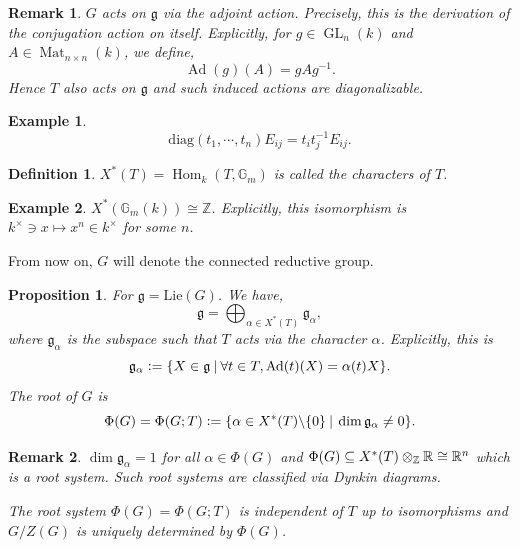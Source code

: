 \documentclass[10pt]{article}
\newtheorem{proposition}{Proposition}[section]
\newtheorem{definition}{Definition}[section]
\newtheorem{remark}{Remark}[section]
\newtheorem{example}{Example}[section]
\numberwithin{equation}{theorem}
\DeclareMathOperator{\GL}{GL}
\DeclareMathOperator{\Ad}{Ad}
\DeclareMathOperator{\Hom}{Hom}
\DeclareMathOperator{\Mat}{Mat}
\newcommand{\defeq}{\vcentcolon=}
\newcommand{\bR}[0]{\mathbb{R}}
\newcommand{\Z}[0]{\mathbb{Z}}
\newcommand{\bG}[0]{\mathbb{G}}
\newcommand{\g}[0]{\mathfrak{g}}
\newcommand{\sep}[0]{\:|\:}
\newcommand{\tens}[1]{%
  \mathbin{\mathop{\otimes}\displaylimits_{#1}}%
}
\begin{document}
\begin{remark}
    $G$ acts on $\g$ via the adjoint action. Precisely, this is the derivation of the conjugation action on itself. Explicitly, for $g\in\GL_n(k)$ and $A\in\Mat_{n\times n}(k)$, we define,
    \begin{equation*}
        \Ad(g)(A) = gAg^{-1}.
    \end{equation*}
    Hence $T$ also acts on $\g$ and such induced actions are diagonalizable.
\end{remark}

\begin{example}
    \begin{equation*}
        \mathrm{diag}(t_1,\cdots,t_n)E_{ij} = t_it_j^{-1}E_{ij}.
    \end{equation*}
\end{example}

\begin{definition}
    $X^*(T)=\Hom_k(T,\bG_m)$ is called the characters of $T$.
\end{definition}

\begin{example}
    $X^*(\bG_m(k)) \cong \Z$. Explicitly, this isomorphism is $k^\times \ni x\mapsto x^n\in k^\times$ for some $n$.
\end{example}

From now on, $G$ will denote the connected reductive group. 

\begin{proposition}
    For $\g=\mathrm{Lie}(G)$. We have,
    \begin{equation*}
        \g = \bigoplus_{\alpha\in X^*(T)}\g_\alpha,
    \end{equation*}
    where $\g_\alpha$ is the subspace such that $T$ acts via the character $\alpha$. Explicitly, this is 
    \begin{equation*}
        \g_\alpha \defeq\{X\in\g\sep \forall t\in T, \Ad(t)(X) = \alpha(t)X\}.
    \end{equation*}
    The root of $G$ is 
    \begin{equation*}
    \Phi(G) = \Phi(G;T) \defeq\{\alpha\in X^*(T)\backslash\{0\}\sep \dim\g_\alpha\not=0\}.
    \end{equation*}
\end{proposition}

\begin{remark}
    $\dim\g_\alpha = 1$ for all $\alpha\in\Phi(G)$ and $\Phi(G)\subseteq X^*(T)\tens{\Z}\bR\cong \bR^n$ which is a root system. Such root systems are classified via Dynkin diagrams.
    \par The root system $\Phi(G)=\Phi(G;T)$ is independent of $T$ up to isomorphisms and $G/Z(G)$ is uniquely determined by $\Phi(G)$.
\end{remark}
\end{document}
